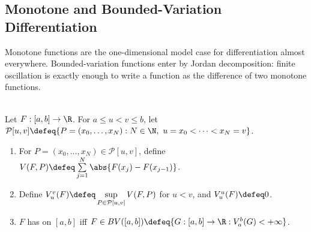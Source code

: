 \subsection{Monotone and Bounded-Variation Differentiation}

Monotone functions are the one-dimensional model case for differentiation almost everywhere. Bounded-variation functions enter by Jordan decomposition: finite oscillation is exactly enough to write a function as the difference of two monotone functions.

\begin{definition} \label{def:bounded-variation-one-variable} \\
Let $F:[a,b]\to\R$. For $a\leq u<v\leq b$, let $\mathcal{P}[u,v]\defeq\{P=(x_0,\ldots,x_N):N\in\N,\ u=x_0<\cdots<x_N=v\}$.
\begin{enumerate}[label=(\roman*)]
\setlength{\itemsep}{0pt}
\item For $P=(x_0,\ldots,x_N)\in\mathcal{P}[u,v]$, define $V(F,P)\defeq\sum\limits_{j=1}^N\abs{F(x_j)-F(x_{j-1})}$.
\item Define $V_u^v(F)\defeq\sup\limits_{P\in\mathcal{P}[u,v]}V(F,P)$ for $u<v$, and $V_u^u(F)\defeq0$.
\item $F$ has  on $[a,b]$ iff $F\in BV([a,b])\defeq\{G:[a,b]\to\R:V_a^b(G)<+\infty\}$.
\end{enumerate}
\end{definition}


